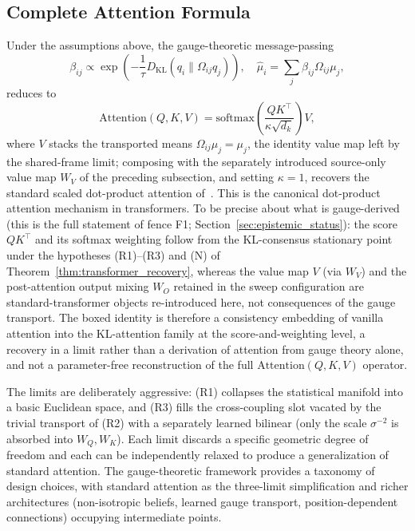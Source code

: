 \documentclass[11pt]{article}
\begin{document}
\subsection{Complete Attention Formula}

Under the assumptions above, the gauge-theoretic message-passing
\begin{equation}
\beta_{ij} \propto \exp\left(-\frac{1}{\tau}D_{\mathrm{KL}}(q_i \| \Omega_{ij} q_j)\right), \quad \hat\mu_i = \sum_j \beta_{ij} \Omega_{ij}\mu_j,
\end{equation}
reduces to
\begin{equation}
\boxed{\mathrm{Attention}(Q,K,V) = \mathrm{softmax}\left(\frac{QK^\top}{\kappa\sqrt{d_k}}\right)V},
\end{equation}
where $V$ stacks the transported means $\Omega_{ij}\mu_j = \mu_j$, the identity value map left by the shared-frame limit; composing with the separately introduced source-only value map $W_V$ of the preceding subsection, and setting $\kappa = 1$, recovers the standard scaled dot-product attention of~\cite{vaswani2017attention}. This is the canonical dot-product attention mechanism in transformers. To be precise about what is gauge-derived (this is the full statement of fence F1; Section~\ref{sec:epistemic_status}): the score $QK^\top$ and its softmax weighting follow from the KL-consensus stationary point under the hypotheses (R1)--(R3) and (N) of Theorem~\ref{thm:transformer_recovery}, whereas the value map $V$ (via $W_V$) and the post-attention output mixing $W_O$ retained in the sweep configuration are standard-transformer objects re-introduced here, not consequences of the gauge transport. The boxed identity is therefore a consistency embedding of vanilla attention into the KL-attention family at the score-and-weighting level, a recovery in a limit rather than a derivation of attention from gauge theory alone, and not a parameter-free reconstruction of the full $\mathrm{Attention}(Q,K,V)$ operator.

The limits are deliberately aggressive: (R1) collapses the statistical manifold into a basic Euclidean space, and (R3) fills the cross-coupling slot vacated by the trivial transport of (R2) with a separately learned bilinear (only the scale $\sigma^{-2}$ is absorbed into $W_Q, W_K$). Each limit discards a specific geometric degree of freedom and each can be independently relaxed to produce a generalization of standard attention. The gauge-theoretic framework provides a taxonomy of design choices, with standard attention as the three-limit simplification and richer architectures (non-isotropic beliefs, learned gauge transport, position-dependent connections) occupying intermediate points.
\end{document}
